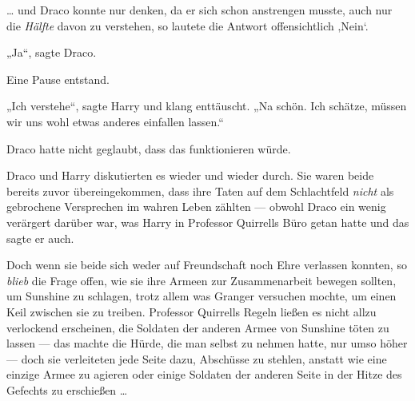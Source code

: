 … und Draco konnte nur denken, da er sich schon anstrengen musste, auch nur die \emph{Hälfte} davon zu verstehen, so lautete die Antwort offensichtlich ‚Nein‘.

„Ja“, sagte Draco.

Eine Pause entstand.

„Ich verstehe“, sagte Harry und klang enttäuscht.
„Na schön. Ich schätze, müssen wir uns wohl etwas anderes einfallen lassen.“

Draco hatte nicht geglaubt, dass das funktionieren würde.

Draco und Harry diskutierten es wieder und wieder durch. Sie waren beide bereits zuvor übereingekommen, dass ihre Taten auf dem Schlachtfeld \emph{nicht} als gebrochene Versprechen im wahren Leben zählten — obwohl Draco ein wenig verärgert darüber war, was Harry in Professor Quirrells Büro getan hatte und das sagte er auch.

Doch wenn sie beide sich weder auf Freundschaft noch Ehre verlassen konnten, so \emph{blieb} die Frage offen, wie sie ihre Armeen zur Zusammenarbeit bewegen sollten, um Sunshine zu schlagen, trotz allem was Granger versuchen mochte, um einen Keil zwischen sie zu treiben. Professor Quirrells Regeln ließen es nicht allzu verlockend erscheinen, die Soldaten der anderen Armee von Sunshine töten zu lassen — das machte die Hürde, die man selbst zu nehmen hatte, nur umso höher — doch sie verleiteten jede Seite dazu, Abschüsse zu stehlen, anstatt wie eine einzige Armee zu agieren oder einige Soldaten der anderen Seite in der Hitze des Gefechts zu erschießen …

